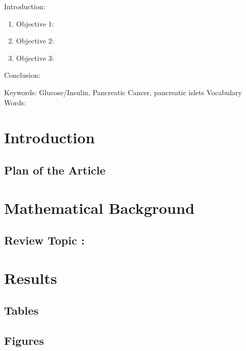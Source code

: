 


\twocolumn
\scriptsize
\begin{frontmatter}
		\title{}
		\author{}
		\address{The Mathematical Learning Space}
\end{frontmatter}	

Introduction:
\begin{enumerate}
\item Objective 1:
\item Objective 2:
\item Objective 3:
\end{enumerate}
Conclusion:

Keywords:  Glucose/Insulin, Pancreatic Cancer, pancreatic islets
Vocabulary Words:

\section{Introduction}

\subsection{Plan of the Article}


\section{Mathematical Background}

\subsection{Review Topic :}

\section{Results}

\subsection{Tables}

\subsection{Figures}

